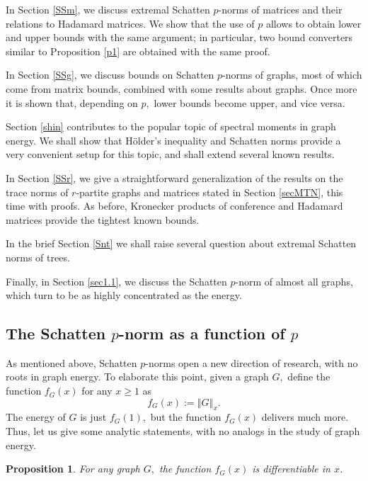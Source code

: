 \documentclass[12pt]{article}%
\newtheorem{proposition}[theorem]{Proposition}
\begin{document}
In Section \ref{SSm}, we discuss extremal Schatten $p$-norms of matrices and
their relations to Hadamard matrices. We show that the use of $p$ allows to
obtain lower and upper bounds with the same argument; in particular, two bound
converters similar to Proposition \ref{p1} are obtained with the same
proof.\medskip

In Section \ref{SSg}, we discuss bounds on Schatten $p$-norms of graphs, most
of which come from matrix bounds, combined with some results about graphs.
Once more it is shown that, depending on $p,$ lower bounds become upper, and
vice versa.\medskip

Section \ref{shin} contributes to the popular topic of spectral moments in
graph energy. We shall show that H\"{o}lder's inequality and Schatten norms
provide a very convenient setup for this topic, and shall extend several known
results.\medskip

In Section \ref{SSr}, we give a straightforward generalization of the results
on the trace norms of $r$-partite graphs and matrices stated in Section
\ref{secMTN}, this time with proofs. As before, Kronecker products of
conference and Hadamard matrices provide the tightest known bounds.\medskip

In the brief Section \ref{Snt} we shall raise several question about extremal
Schatten norms of trees.\medskip

Finally, in Section \ref{sec1.1}, we discuss the Schatten $p$-norm of almost
all graphs, which turn to be as highly concentrated as the energy.

\subsection{\label{SSS}The Schatten $p$-norm as a function of $p$}

As mentioned above, Schatten $p$-norms open a new direction of research, with
no roots in graph energy. To elaborate this point, given a graph $G,$ define
the function $f_{G}\left(  x\right)  $ for any $x\geq1$ as%
\[
f_{G}\left(  x\right)  :=\left\Vert G\right\Vert _{x}.
\]
The energy of $G$ is just $f_{G}\left(  1\right)  ,$ but the function
$f_{G}\left(  x\right)  $ delivers much more. Thus, let us give some analytic
statements, with no analogs in the study of graph energy.

\begin{proposition}
\label{ps1}For any graph $G,$ the function $f_{G}\left(  x\right)  $ is
differentiable in $x$.
\end{proposition}
\end{document}
